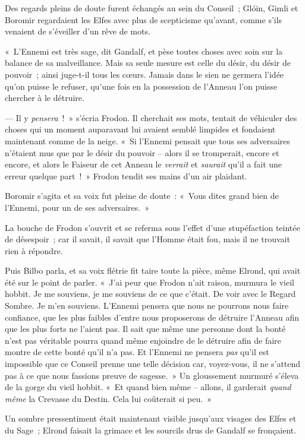 Des regards pleins de doute furent échangés au sein du Conseil~; Glóin, Gimli et Boromir regardaient les Elfes avec plus de scepticisme qu'avant, comme s'ils venaient de s'éveiller d'un rêve de mots.

«~L'Ennemi est très sage, dit Gandalf, et pèse toutes choses avec soin sur la balance de sa malveillance.
Mais sa seule mesure est celle du désir, du désir de pouvoir~; ainsi juge-t-il tous les cœurs.
Jamais dans le sien ne germera l'idée qu'on puisse le refuser, qu'une fois en la possession de l'Anneau l'on puisse chercher à le détruire.

--- Il y \emph{pensera}~!~»
s'écria Frodon.
Il cherchait ses mots, tentait de véhiculer des choses qui un moment auparavant lui avaient semblé limpides et fondaient maintenant comme de la neige.
«~Si l'Ennemi pensait que tous ses adversaires n'étaient mus que par le désir du pouvoir -- alors il se tromperait, encore et encore, et alors le Faiseur de cet Anneau le \emph{verrait} et \emph{saurait} qu'il a fait une erreur quelque part~!~»
Frodon tendit ses mains d'un air plaidant.

Boromir s'agita et sa voix fut pleine de doute~: «~Vous dites grand bien de l'Ennemi, pour un de ses adversaires.~»

La bouche de Frodon s'ouvrit et se referma sous l'effet d'une stupéfaction teintée de désespoir~; car il savait, il savait que l'Homme était fou, mais il ne trouvait rien à répondre.

Puis Bilbo parla, et sa voix flétrie fit taire toute la pièce, même Elrond, qui avait été sur le point de parler.
«~J'ai peur que Frodon n'ait raison, murmura le vieil hobbit.
Je me souviens, je me souviens de ce que c'était.
De voir avec le Regard Sombre.
Je m'en souviens.
L'Ennemi pensera que nous ne pourrons nous faire confiance, que les plus faibles d'entre nous proposerons de détruire l'Anneau afin que les plus forts ne l'aient pas.
Il sait que même une personne dont la bonté n'est pas véritable pourra quand même enjoindre de le détruire afin de faire montre de cette bonté qu'il n'a pas.
Et l'Ennemi ne pensera \emph{pas} qu'il est impossible que ce Conseil prenne une telle décision car, voyez-vous, il ne s'attend pas à ce que nous fassions preuve de sagesse.~»
Un gloussement murmuré s'éleva de la gorge du vieil hobbit.
«~Et quand bien même -- allons, il garderait \emph{quand même} la Crevasse du Destin.
Cela lui coûterait si peu.~»

Un sombre pressentiment était maintenant visible jusqu'aux visages des Elfes et du Sage~; Elrond faisait la grimace et les sourcils drus de Gandalf se fronçaient.

